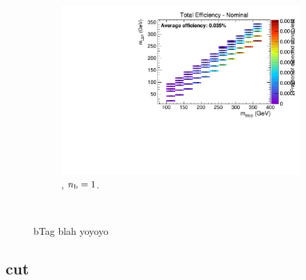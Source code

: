 \begin{figure}[ht!]
\begin{subfigure}[b]{0.32\textwidth}
    \includegraphics[width=\textwidth, page=6]{Figs/sms/t2cc/v24/bTag_T2cc_v24_eq1b_ge4j_incl.pdf}
    \caption{\njhigh, $n_{\text{b}} = 1$.}
  \end{subfigure}\\
  \caption{bTag blah yoyoyo}
  \label{fig:sms-btag-t2cc}
\end{figure}


\newpage
\subsection*{\mhtmet cut}

